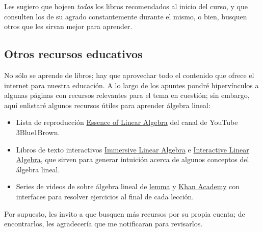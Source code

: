 \documentclass[12pt,dvipsnames]{article}
\begin{document}
Les sugiero que hojeen \emph{todos} los libros recomendados al inicio del curso, y que consulten los de su agrado constantemente durante el mismo, o bien, busquen otros que les sirvan mejor para aprender.

\subsection{Otros recursos educativos}

No sólo se aprende de libros; hay que aprovechar todo el contenido que ofrece el internet para nuestra educación. A lo largo de los apuntes pondré hipervínculos a algunas páginas con recursos relevantes para el tema en cuestión; sin embargo, aquí enlistaré algunos recursos útiles para aprender álgebra lineal:

\begin{itemize}
    \item Lista de reproducción \href{https://www.youtube.com/watch?v=fNk_zzaMoSs&list=PLZHQObOWTQDPD3MizzM2xVFitgF8hE_ab}{Essence of Linear Algebra} del canal de YouTube 3Blue1Brown.
    \item Libros de texto interactivos \href{{http://immersivemath.com/ila/learnmore.html}}{Immersive Linear Algebra} e \href{https://textbooks.math.gatech.edu/ila/index2.html}{Interactive Linear Algebra}, que sirven para generar intuición acerca de algunos conceptos del álgebra lineal.
    \item Series de videos de sobre álgebra lineal de \href{https://www.lem.ma/books/AIApowDnjlDDQrp-uOZVow/landing}{lemma} y \href{https://www.khanacademy.org/math/linear-algebra}{Khan Academy} con interfaces para resolver ejercicios al final de cada lección.
\end{itemize}

Por supuesto, les invito a que busquen más recursos por su propia cuenta; de encontrarlos, les agradecería que me notificaran para revisarlos.
\fi
\end{document}
